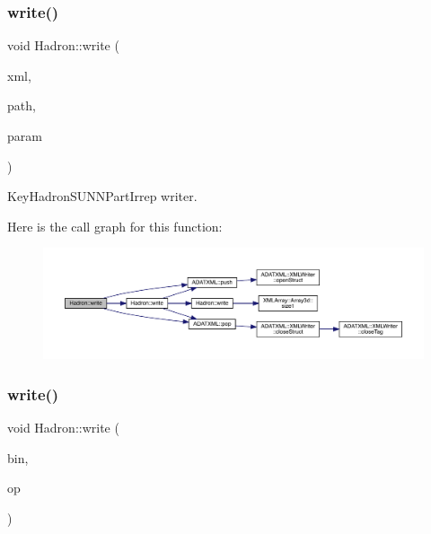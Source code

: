 \subsubsection{\texorpdfstring{write()}{write()}\hspace{0.1cm}{\footnotesize\ttfamily [72/95]}}
{\footnotesize\ttfamily void Hadron\+::write (\begin{DoxyParamCaption}\item[{\mbox{\hyperlink{classADATXML_1_1XMLWriter}{X\+M\+L\+Writer}} \&}]{xml,  }\item[{const std\+::string \&}]{path,  }\item[{const \mbox{\hyperlink{structHadron_1_1KeyHadronSUNNPartIrrepOp__t}{Key\+Hadron\+S\+U\+N\+N\+Part\+Irrep\+Op\+\_\+t}} \&}]{param }\end{DoxyParamCaption})}



Key\+Hadron\+S\+U\+N\+N\+Part\+Irrep writer. 

Here is the call graph for this function\+:
\nopagebreak
\begin{figure}[H]
\begin{center}
\leavevmode
\includegraphics[width=350pt]{d1/daf/namespaceHadron_a04a5b512d84ea116e0714765e22cbc30_cgraph}
\end{center}
\end{figure}
\mbox{\label{namespaceHadron_a6d8b26c4e0e11ca4b20e046f2595326e}} 
\subsubsection{\texorpdfstring{write()}{write()}\hspace{0.1cm}{\footnotesize\ttfamily [73/95]}}
{\footnotesize\ttfamily void Hadron\+::write (\begin{DoxyParamCaption}\item[{\mbox{\hyperlink{classADATIO_1_1BinaryWriter}{Binary\+Writer}} \&}]{bin,  }\item[{const \mbox{\hyperlink{structHadron_1_1HadronVertex__t}{Hadron\+Vertex\+\_\+t}} \&}]{op }\end{DoxyParamCaption})}

